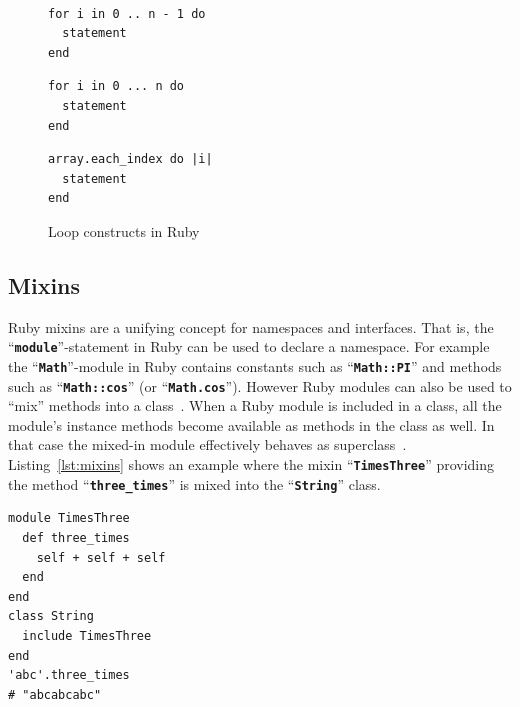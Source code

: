 \documentclass[12pt,a4paper,oneside,openright]{book}
\newcommand{\Eg}{For ex\-am\-ple }
\newcommand{\Ie}{That is, }
\newcommand{\lst}[1]{Listing~\ref{lst:#1}}
\newcommand{\code}[1]{``\texttt{\textbf{\textcolor{codegray}{\small{#1}}}}''}
\begin{document}
\begin{CJK}{UTF8}{}
\begin{figure}[htbp]
\begin{center}
\begin{minipage}[c]{.3\textwidth}
    \end{minipage}\\
    \begin{minipage}[c]{.3\textwidth}
      \begin{lstlisting}
for i in 0 .. n - 1 do
  statement
end
      \end{lstlisting}
    \end{minipage}\hspace{1ex}
    \begin{minipage}[c]{.3\textwidth}
      \begin{lstlisting}
for i in 0 ... n do
  statement
end
      \end{lstlisting}
    \end{minipage}\hspace{1ex}
    \begin{minipage}[c]{.3\textwidth}
      \begin{lstlisting}
array.each_index do |i|
  statement
end
      \end{lstlisting}
    \end{minipage}
  \end{center}
  \caption{Loop constructs in Ruby~\citep{RefWorks:541}\label{fig:loops}}
\end{figure}

\subsection{Mixins}
Ruby mixins are a unifying concept for namespaces and interfaces. \Ie the \code{module}-statement in Ruby can be used to declare a namespace. \Eg the \code{Math}-module in Ruby contains constants such as \code{Math::PI} and methods such as \code{Math::cos} (or \code{Math.cos}). However Ruby modules can also be used to ``mix'' methods into a class~\citep{RefWorks:541}. When a Ruby module is included in a class, all the module's instance methods become available as methods in the class as well. In that case the mixed-in module effectively behaves as superclass~\citep{thomas2004programming}. \lst{mixins} shows an example where the mixin \code{TimesThree} providing the method \code{three\_times} is mixed into the \code{String} class.
\lstset{language=Ruby,frame=single,numbers=none}
\begin{lstlisting}[float=htbp,caption={Mixins in Ruby},label=lst:mixins]
module TimesThree
  def three_times
    self + self + self
  end
end
class String
  include TimesThree
end
'abc'.three_times      
# "abcabcabc"
\end{lstlisting}


\end{CJK}
\end{document}
